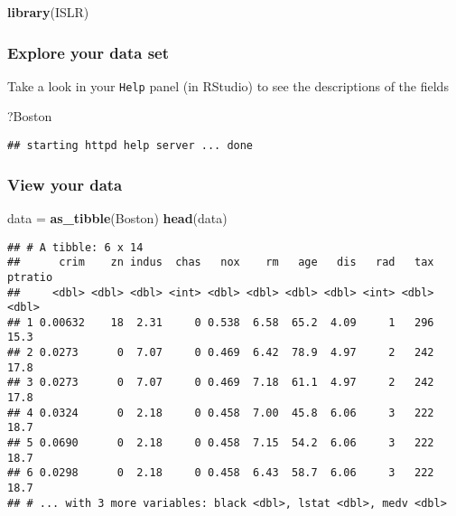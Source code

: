 \documentclass[]{article}
\newenvironment{Shaded}{\begin{snugshade}}{\end{snugshade}}
\newcommand{\KeywordTok}[1]{\textcolor[rgb]{0.13,0.29,0.53}{\textbf{#1}}}
\newcommand{\NormalTok}[1]{#1}
\newcommand{\StringTok}[1]{\textcolor[rgb]{0.31,0.60,0.02}{#1}}
\begin{document}
\begin{Shaded}
\begin{Highlighting}[]
\KeywordTok{library}\NormalTok{(ISLR)}
\end{Highlighting}
\end{Shaded}

\hypertarget{explore-your-data-set}{%
\subsubsection{Explore your data set}\label{explore-your-data-set}}

Take a look in your \texttt{Help} panel (in RStudio) to see the
descriptions of the fields

\begin{Shaded}
\begin{Highlighting}[]
\NormalTok{?Boston}
\end{Highlighting}
\end{Shaded}

\begin{verbatim}
## starting httpd help server ... done
\end{verbatim}

\hypertarget{view-your-data}{%
\subsubsection{View your data}\label{view-your-data}}

\begin{Shaded}
\begin{Highlighting}[]
\NormalTok{data =}\StringTok{ }\KeywordTok{as_tibble}\NormalTok{(Boston)}
\KeywordTok{head}\NormalTok{(data)}
\end{Highlighting}
\end{Shaded}

\begin{verbatim}
## # A tibble: 6 x 14
##      crim    zn indus  chas   nox    rm   age   dis   rad   tax ptratio
##     <dbl> <dbl> <dbl> <int> <dbl> <dbl> <dbl> <dbl> <int> <dbl>   <dbl>
## 1 0.00632    18  2.31     0 0.538  6.58  65.2  4.09     1   296    15.3
## 2 0.0273      0  7.07     0 0.469  6.42  78.9  4.97     2   242    17.8
## 3 0.0273      0  7.07     0 0.469  7.18  61.1  4.97     2   242    17.8
## 4 0.0324      0  2.18     0 0.458  7.00  45.8  6.06     3   222    18.7
## 5 0.0690      0  2.18     0 0.458  7.15  54.2  6.06     3   222    18.7
## 6 0.0298      0  2.18     0 0.458  6.43  58.7  6.06     3   222    18.7
## # ... with 3 more variables: black <dbl>, lstat <dbl>, medv <dbl>
\end{verbatim}
\end{document}
